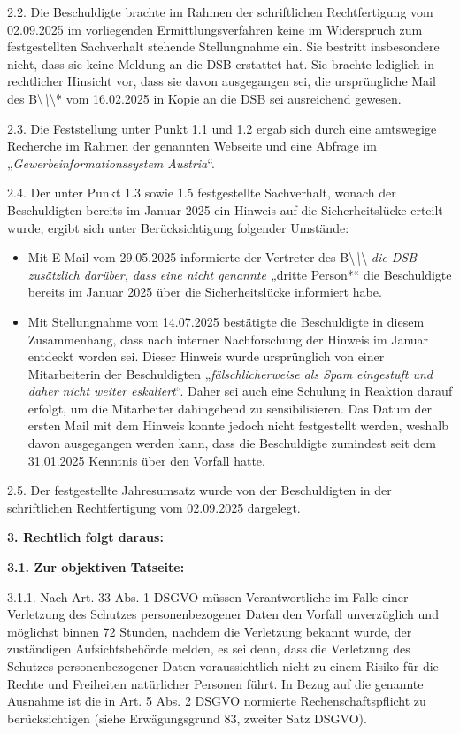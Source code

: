 \documentclass[11pt,a4paper]{article}
\begin{document}
2.2. Die Beschuldigte brachte im Rahmen der schriftlichen Rechtfertigung vom 02.09.2025 im vorliegenden Ermittlungsverfahren keine im Widerspruch zum festgestellten Sachverhalt stehende Stellungnahme ein. Sie bestritt insbesondere nicht, dass sie keine Meldung an die DSB erstattet hat. Sie brachte lediglich in rechtlicher Hinsicht vor, dass sie davon ausgegangen sei, die ursprüngliche Mail des B\textbackslash{}\textit{\textbackslash{}}\textbackslash{}* vom 16.02.2025 in Kopie an die DSB sei ausreichend gewesen.

2.3. Die Feststellung unter Punkt 1.1 und 1.2 ergab sich durch eine amtswegige Recherche im Rahmen der genannten Webseite und eine Abfrage im „\textit{Gewerbeinformationssystem Austria}“.

2.4. Der unter Punkt 1.3 sowie 1.5 festgestellte Sachverhalt, wonach der Beschuldigten bereits im Januar 2025 ein Hinweis auf die Sicherheitslücke erteilt wurde, ergibt sich unter Berücksichtigung folgender Umstände:

\begin{itemize}
\item Mit E-Mail vom 29.05.2025 informierte der Vertreter des B\textbackslash{}\textit{\textbackslash{}}\textbackslash{}\textit{ die DSB zusätzlich darüber, dass eine nicht genannte „}dritte Person*“ die Beschuldigte bereits im Januar 2025 über die Sicherheitslücke informiert habe.
\item Mit Stellungnahme vom 14.07.2025 bestätigte die Beschuldigte in diesem Zusammenhang, dass nach interner Nachforschung der Hinweis im Januar entdeckt worden sei. Dieser Hinweis wurde ursprünglich von einer Mitarbeiterin der Beschuldigten „\textit{fälschlicherweise als Spam eingestuft und daher nicht weiter eskaliert}“. Daher sei auch eine Schulung in Reaktion darauf erfolgt, um die Mitarbeiter dahingehend zu sensibilisieren. Das Datum der ersten Mail mit dem Hinweis konnte jedoch nicht festgestellt werden, weshalb davon ausgegangen werden kann, dass die Beschuldigte zumindest seit dem 31.01.2025 Kenntnis über den Vorfall hatte.
\end{itemize}

2.5. Der festgestellte Jahresumsatz wurde von der Beschuldigten in der schriftlichen Rechtfertigung vom 02.09.2025 dargelegt.

\textbf{3. Rechtlich folgt daraus:}

\textbf{3.1. Zur objektiven Tatseite:}

3.1.1. Nach Art. 33 Abs. 1 DSGVO müssen Verantwortliche im Falle einer Verletzung des Schutzes personenbezogener Daten den Vorfall unverzüglich und möglichst binnen 72 Stunden, nachdem die Verletzung bekannt wurde, der zuständigen Aufsichtsbehörde melden, es sei denn, dass die Verletzung des Schutzes personenbezogener Daten voraussichtlich nicht zu einem Risiko für die Rechte und Freiheiten natürlicher Personen führt. In Bezug auf die genannte Ausnahme ist die in Art. 5 Abs. 2 DSGVO normierte Rechenschaftspflicht zu berücksichtigen (siehe Erwägungsgrund 83, zweiter Satz DSGVO).
\end{document}
